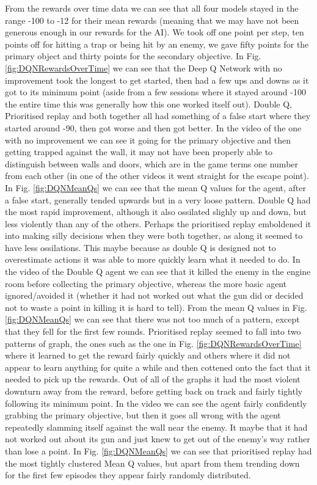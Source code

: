 \documentclass[a4pape, 11pt, english]{article}
\begin{document}
From the rewards over time data we can see that all four models stayed in the range -100 to -12 for their mean rewards (meaning that we may have not been generous enough in our rewards for the AI). We took off one point per step, ten points off for hitting a trap or being hit by an enemy, we gave fifty points for the primary object and thirty points for the secondary objective. In Fig. \ref{fig:DQNRewardsOverTime} we can see that the Deep Q Network with no improvement took the longest to get started, then had a few ups and downs as it got to its minimum point (aside from a few sessions where it stayed around -100 the entire time this was generally how this one worked itself out). Double Q, Prioritised replay and both together all had something of a false start where they started around -90, then got worse and then got better. In the video of the one with no improvement we can see it going for the primary objective and then getting trapped against the wall, it may not have been properly able to distinguish between walls and doors, which are in the game terms one number from each other (in one of the other videos it went straight for the escape point). In Fig. \ref{fig:DQNMeanQs} we can see that the mean Q values for the agent, after a false start, generally tended upwards but in a very loose pattern.
Double Q had the most rapid improvement, although it also ossilated slighly up and down, but less violently than any of the others. Perhaps the prioritised replay emboldened it into making silly decisions when they were both together, as along it seemed to have less ossilations. This maybe because as double Q is designed not to overestimate actions it was able to more quickly learn what it needed to do. In the video of the Double Q agent we can see that it killed the enemy in the engine room before collecting the primary objective, whereas the more basic agent ignored/avoided it (whether it had not worked out what the gun did or decided not to waste a point in killing it is hard to tell). From the mean Q values in Fig. \ref{fig:DQNMeanQs} we can see that there was not too much of a pattern, except that they fell for the first few rounds.
Prioritised replay seemed to fall into two patterns of graph, the ones such as the one in Fig. \ref{fig:DQNRewardsOverTime} where it learned to get the reward fairly quickly and others where it did not appear to learn anything for quite a while and then cottened onto the fact that it needed to pick up the rewards. Out of all of the graphs it had the most violent downturn away from the reward, before getting back on track and fairly tightly following its minimum point. In the video we can see the agent fairly confidently grabbing the primary objective, but then it goes all wrong with the agent repeatedly slamming itself against the wall near the enemy. It maybe that it had not worked out about its gun and just knew to get out of the enemy's way rather than lose a point. In Fig. \ref{fig:DQNMeanQs} we can see that prioritised replay had the most tightly clustered Mean Q values, but apart from them trending down for the first few episodes they appear fairly randomly distributed.
\end{document}
